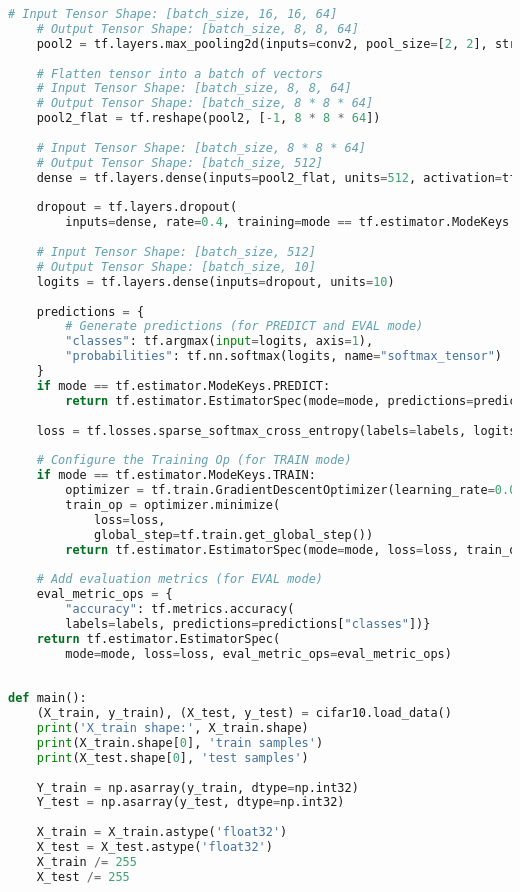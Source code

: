 \documentclass[letterpaper]{article}
\begin{document}
\begin{appendices}
\begin{lstlisting}[language=python]
	# Input Tensor Shape: [batch_size, 16, 16, 64]
	# Output Tensor Shape: [batch_size, 8, 8, 64]
	pool2 = tf.layers.max_pooling2d(inputs=conv2, pool_size=[2, 2], strides=2)
	
	# Flatten tensor into a batch of vectors
	# Input Tensor Shape: [batch_size, 8, 8, 64]
	# Output Tensor Shape: [batch_size, 8 * 8 * 64]
	pool2_flat = tf.reshape(pool2, [-1, 8 * 8 * 64])
	
	# Input Tensor Shape: [batch_size, 8 * 8 * 64]
	# Output Tensor Shape: [batch_size, 512]
	dense = tf.layers.dense(inputs=pool2_flat, units=512, activation=tf.nn.relu)
	
	dropout = tf.layers.dropout(
		inputs=dense, rate=0.4, training=mode == tf.estimator.ModeKeys.TRAIN)
	
	# Input Tensor Shape: [batch_size, 512]
	# Output Tensor Shape: [batch_size, 10]
	logits = tf.layers.dense(inputs=dropout, units=10)
	
	predictions = {
		# Generate predictions (for PREDICT and EVAL mode)
		"classes": tf.argmax(input=logits, axis=1),
		"probabilities": tf.nn.softmax(logits, name="softmax_tensor")
	}
	if mode == tf.estimator.ModeKeys.PREDICT:
		return tf.estimator.EstimatorSpec(mode=mode, predictions=predictions)
	
	loss = tf.losses.sparse_softmax_cross_entropy(labels=labels, logits=logits)
	
	# Configure the Training Op (for TRAIN mode)
	if mode == tf.estimator.ModeKeys.TRAIN:
		optimizer = tf.train.GradientDescentOptimizer(learning_rate=0.001)
		train_op = optimizer.minimize(
			loss=loss,
			global_step=tf.train.get_global_step())
		return tf.estimator.EstimatorSpec(mode=mode, loss=loss, train_op=train_op)
	
	# Add evaluation metrics (for EVAL mode)
	eval_metric_ops = {
		"accuracy": tf.metrics.accuracy(
		labels=labels, predictions=predictions["classes"])}
	return tf.estimator.EstimatorSpec(
		mode=mode, loss=loss, eval_metric_ops=eval_metric_ops)
	
	
def main():
	(X_train, y_train), (X_test, y_test) = cifar10.load_data()
	print('X_train shape:', X_train.shape)
	print(X_train.shape[0], 'train samples')
	print(X_test.shape[0], 'test samples')
	
	Y_train = np.asarray(y_train, dtype=np.int32)
	Y_test = np.asarray(y_test, dtype=np.int32)
	
	X_train = X_train.astype('float32')
	X_test = X_test.astype('float32')
	X_train /= 255
	X_test /= 255
	

\end{lstlisting}
\end{appendices}
\end{document}
